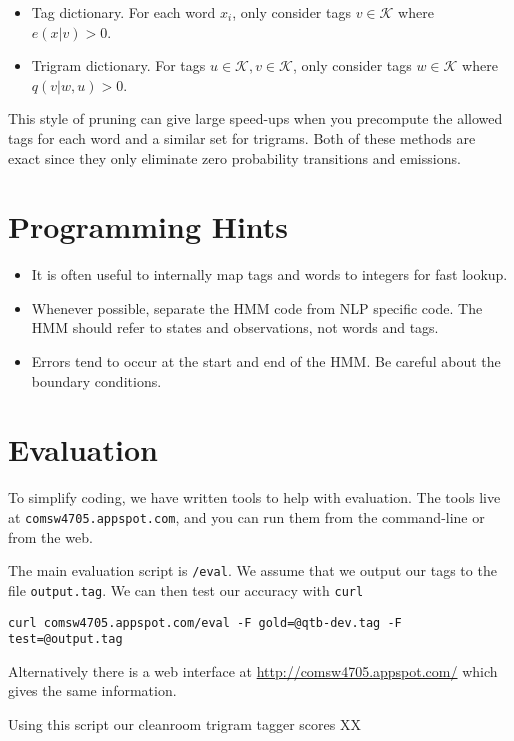 \documentclass{article}
\begin{document}
\begin{itemize}
\item Tag dictionary. For each word $x_i$, only consider tags $v \in \mathcal{K}$ where $e(x | v) > 0$.
\item Trigram dictionary. For tags $u \in \mathcal{K}, v \in \mathcal{K}$, only consider tags $w \in \mathcal{K}$ where $q(v | w, u) > 0$.
\end{itemize}

This style of pruning can give large speed-ups when you precompute the allowed tags for each word and a similar set for trigrams.
Both of these methods are exact since they only eliminate zero probability transitions and emissions.

\section{Programming Hints}

\begin{itemize}
\item It is often useful to internally map tags and words to integers for fast lookup.
\item Whenever possible, separate the HMM code from NLP specific code. The HMM should refer to states and observations, not words and tags.
\item Errors tend to occur at the start and end of the HMM. Be careful about the boundary conditions.
\end{itemize}

\section{Evaluation}

To simplify coding, we have written tools to help with evaluation. The tools live at \texttt{comsw4705.appspot.com}, and you can run them from the command-line or from the web.

The main evaluation script is \texttt{/eval}. We assume that we output our tags to the file \texttt{output.tag}. We can then test our accuracy with \texttt{curl}

\begin{verbatim}
curl comsw4705.appspot.com/eval -F gold=@qtb-dev.tag -F test=@output.tag
\end{verbatim}

Alternatively there is a web interface at \url{http://comsw4705.appspot.com/} which gives the same information.

Using this script our cleanroom trigram tagger scores XX%
\end{document}
